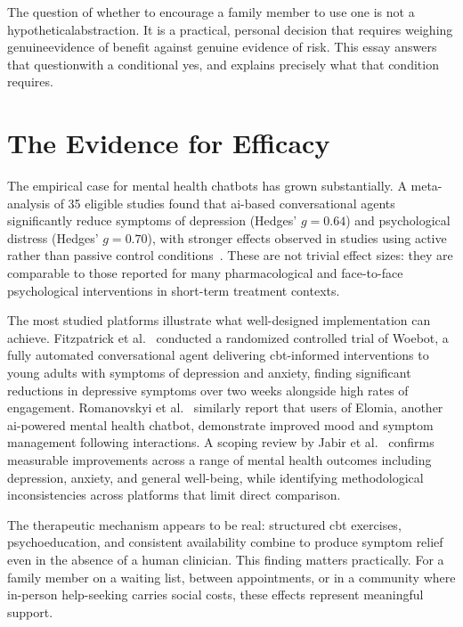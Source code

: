 \documentclass[11pt,showkeys]{essay}
\begin{document}
The question of whether to encourage a family member to use one is not a hypotheticalabstraction. It is a practical, personal decision that requires weighing genuineevidence of benefit against genuine evidence of risk. This essay answers that questionwith a conditional yes, and explains precisely what that condition requires.

\section{The Evidence for Efficacy}

The empirical case for mental health chatbots has grown substantially. A meta-analysis of 35 eligible studies found that \gls{ai}-based conversational agents significantly reduce symptoms of depression (Hedges' $g = 0.64$) and psychological distress (Hedges' $g = 0.70$), with stronger effects observed in studies using active rather than passive control conditions~\cite{lim_systematic_2023}. These are not trivial effect sizes: they are comparable to those reported for many pharmacological and face-to-face psychological interventions in short-term treatment contexts.

The most studied platforms illustrate what well-designed implementation can achieve. Fitzpatrick et al.~\cite{fitzpatrick_woebot_2017} conducted a randomized controlled trial of Woebot, a fully automated conversational agent delivering \gls{cbt}-informed interventions to young adults with symptoms of depression and anxiety, finding significant reductions in depressive symptoms over two weeks alongside high rates of engagement. Romanovskyi et al.~\cite{romanovskyi_elomia_2021} similarly report that users of Elomia, another \gls{ai}-powered mental health chatbot, demonstrate improved mood and symptom management following interactions. A scoping review by Jabir et al.~\cite{jabir_evaluating_2022} confirms measurable improvements across a range of mental health outcomes including depression, anxiety, and general well-being, while identifying methodological inconsistencies across platforms that limit direct comparison.

The therapeutic mechanism appears to be real: structured \gls{cbt} exercises, psychoeducation, and consistent availability combine to produce symptom relief even in the absence of a human clinician. This finding matters practically. For a family member on a waiting list, between appointments, or in a community where in-person help-seeking carries social costs, these effects represent meaningful support.
\end{document}
